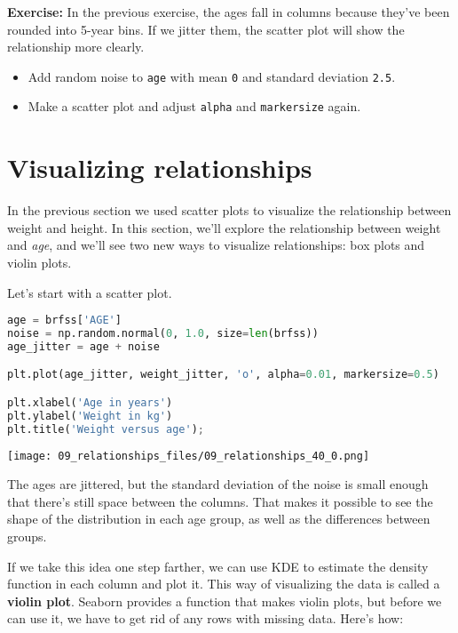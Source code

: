 \textbf{Exercise:} In the previous exercise, the ages fall in columns
because they've been rounded into 5-year bins. If we jitter them, the
scatter plot will show the relationship more clearly.

\begin{itemize}

\item
  Add random noise to \passthrough{\lstinline!age!} with mean
  \passthrough{\lstinline!0!} and standard deviation
  \passthrough{\lstinline!2.5!}.
\item
  Make a scatter plot and adjust \passthrough{\lstinline!alpha!} and
  \passthrough{\lstinline!markersize!} again.
\end{itemize}

\section{Visualizing relationships}\label{visualizing-relationships}

In the previous section we used scatter plots to visualize the
relationship between weight and height. In this section, we'll explore
the relationship between weight and \emph{age}, and we'll see two new
ways to visualize relationships: box plots and violin plots.

Let's start with a scatter plot.

\begin{lstlisting}[language=Python,style=source]
age = brfss['AGE']
noise = np.random.normal(0, 1.0, size=len(brfss))
age_jitter = age + noise

plt.plot(age_jitter, weight_jitter, 'o', alpha=0.01, markersize=0.5)

plt.xlabel('Age in years')
plt.ylabel('Weight in kg')
plt.title('Weight versus age');
\end{lstlisting}

\begin{center}
\texttt{[image: 09\_relationships\_files/09\_relationships\_40\_0.png]}
\end{center}

The ages are jittered, but the standard deviation of the noise is small
enough that there's still space between the columns. That makes it
possible to see the shape of the distribution in each age group, as well
as the differences between groups.

If we take this idea one step farther, we can use KDE to estimate the
density function in each column and plot it. This way of visualizing the
data is called a \textbf{violin plot}. Seaborn provides a function that
makes violin plots, but before we can use it, we have to get rid of any
rows with missing data. Here's how:

